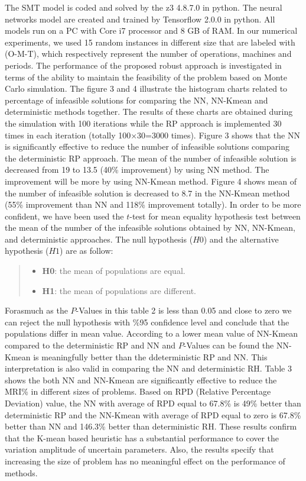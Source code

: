 \documentclass[letterpaper]{article} %
\begin{document}
The SMT model is coded and solved by the z3 4.8.7.0 in python. The neural networks model are created and trained by Tensorflow 2.0.0 in python. All models run on a PC with Core i7 processor and 8 GB of RAM. In our numerical experiments, we used 15 random instances in different size that are labeled with (O-M-T), which respectively represent the number of operations, machines and periods. The performance of the proposed robust approach is investigated in terms of the ability to maintain the feasibility of the problem based on Monte Carlo simulation.
The figure 3 and 4 illustrate the histogram charts related to percentage of infeasible solutions for comparing the NN, NN-Kmean and deterministic methods together. The results of these charts are obtained during the simulation with 100 iterations while the RP approach is implemented 30 times in each iteration (totally 100×30=3000 times).
Figure 3 shows that the NN is significantly effective to reduce the number of infeasible solutions comparing the deterministic RP approach. The mean of the number of infeasible solution is decreased from 19 to 13.5 (40\% improvement) by using NN method. The improvement will be more by using NN-Kmean method. Figure 4 shows mean of the number of infeasible solution is decreased to 8.7 in the NN-Kmean method (55\% improvement than NN and 118\% improvement totally).
In order to be more confident, we have been used the $t$-test for mean equality hypothesis test between the mean of the number of the infeasible solutions obtained by NN, NN-Kmean, and deterministic approaches. The null hypothesis ($H0$) and the alternative hypothesis ($H1$) are as follow:
\begin{quote}
\begin{itemize}
\item \textbf{H0}: the mean of populations are equal.
\item \textbf{H1}: the mean of populations are different.
\end{itemize}
\end{quote}
Forasmuch as the $P$-Values in this table 2 is less than 0.05 and close to zero we can reject the null hypothesis with \%95 confidence level and conclude that the populations differ in mean value. According to a lower mean value of NN-Kmean compared to the deterministic RP and NN and $P$-Values can be found the NN-Kmean is meaningfully better than the ddeterministic RP and NN. This interpretation is also valid in comparing the NN and deterministic RH.
Table 3 shows the both NN and NN-Kmean are significantly effective to reduce the MRI\% in different sizes of problems. Based on RPD (Relative Percentage Deviation) value, the NN with average of RPD equal to 67.8\% is 49\% better than deterministic RP and the NN-Kmean with average of RPD equal to zero is 67.8\% better than NN and 146.3\% better than deterministic RH. These results confirm that the K-mean based heuristic has a substantial performance to cover the variation amplitude of uncertain parameters. Also, the results specify that increasing the size of problem has no meaningful effect on the performance of methods. 
\end{document}
